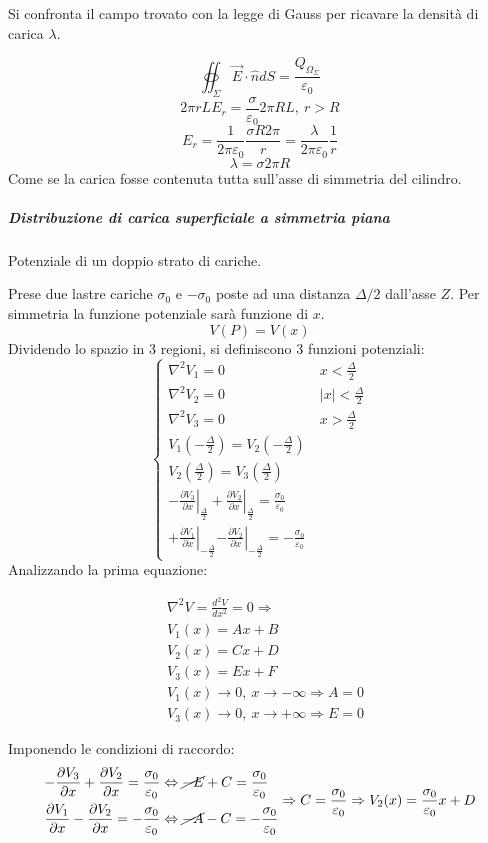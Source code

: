 Si confronta il campo trovato con la legge di Gauss per ricavare la densità di carica $\lambda$.

$$
\oiint_\Sigma \vec{E}\cdot\hat{n}dS = \frac{Q_{\Omega_\Sigma}}{\varepsilon_0}
$$
$$
2 \pi r L E_r = \frac{\sigma}{\varepsilon_0} 2 \pi R L,\ r > R
$$
$$
E_r = \frac{1}{2 \pi \varepsilon_0} \frac{\sigma R 2 \pi}{r} = \frac{\lambda}{2\pi\varepsilon_0}\frac{1}{r}
$$
$$
\lambda = \sigma 2 \pi R
$$
Come se la carica fosse contenuta tutta sull'asse di simmetria del cilindro.


\subparagraph{Distribuzione di carica superficiale a simmetria piana}
Potenziale di un doppio strato di cariche.

Prese due lastre cariche $\sigma_0$ e $-\sigma_0$ poste ad una distanza $\Delta/2$ dall'asse $Z$.
Per simmetria la funzione potenziale sarà funzione di $x$.
$$
V(P) = V(x)
$$
Dividendo lo spazio in 3 regioni, si definiscono 3 funzioni potenziali:
$$
\begin{cases}
\nabla^2V_1 = 0 &x < \frac{\Delta}{2}\\
\nabla^2V_2 = 0 & |x| < \frac{\Delta}{2}\\
\nabla^2V_3 = 0 & x > \frac{\Delta}{2}\\
V_1(-\frac{\Delta}{2}) = V_2(-\frac{\Delta}{2}) \\
V_2(\frac{\Delta}{2}) = V_3(\frac{\Delta}{2}) \\
-\left.\frac{\partial V_3}{\partial x}\right|_{\frac{\Delta}{2}} + \left. \frac{\partial V_2}{\partial x}\right|_{\frac{\Delta}{2}} = \frac{\sigma_0}{\varepsilon_0} \\
+\left. \frac{\partial V_1}{\partial x}\right|_{-\frac{\Delta}{2}}  \left.-\frac{\partial V_2}{\partial x}\right|_{-\frac{\Delta}{2}} = -\frac{\sigma_0}{\varepsilon_0}\
\end{cases}
$$
Analizzando la prima equazione:

\begin{align*}
&\nabla^2V = \frac{d^2V}{dx^2} = 0 \Rightarrow \\
&V_1(x) = Ax+B \\
&V_2(x) = Cx+D \\
&V_3(x) = Ex + F \\
&V_1(x) \to 0, \ x\to -\infty \Rightarrow A = 0 \\
&V_3(x) \to 0, \ x\to +\infty \Rightarrow E = 0 
\end{align*}

Imponendo le condizioni di raccordo:
$$
\begin{aligned}
-\frac{\partial V_3}{\partial x} + \frac{\partial V_2}{\partial x} = \frac{\sigma_0}{\varepsilon_0} 
&\Leftrightarrow \cancel{-E} + C = \frac{\sigma_0}{\varepsilon_0}\\
\frac{\partial V_1}{\partial x} - \frac{\partial V_2}{\partial x} = -\frac{\sigma_0}{\varepsilon_0}
&\Leftrightarrow \cancel{-A} - C = -\frac{\sigma_0}{\varepsilon_0}
\end{aligned} \Rightarrow C = \frac{\sigma_0}{\varepsilon_0} \Rightarrow V_2(x) = \frac{\sigma_0}{\varepsilon_0}x + D
$$

